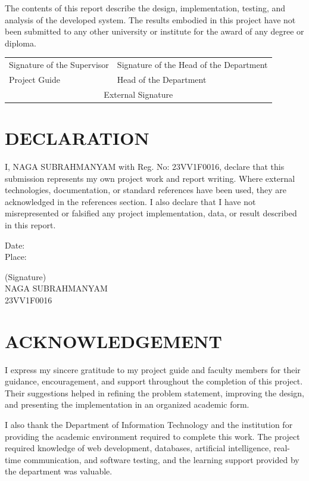 \documentclass[12pt,a4paper]{report}
\begin{document}
The contents of this report describe the design, implementation, testing, and analysis of the developed system. The results embodied in this project have not been submitted to any other university or institute for the award of any degree or diploma.

\vspace{1.8cm}
\noindent\begin{tabular}{p{}p{}}
Signature of the Supervisor & Signature of the Head of the Department\\[1.6cm]
Project Guide & Head of the Department\\[1.4cm]
\multicolumn{2}{c}{External Signature}
\end{tabular}

\clearpage
\chapter*{DECLARATION}
\justifying
I, NAGA SUBRAHMANYAM with Reg. No: 23VV1F0016, declare that this submission represents my own project work and report writing. Where external technologies, documentation, or standard references have been used, they are acknowledged in the references section. I also declare that I have not misrepresented or falsified any project implementation, data, or result described in this report.

\vspace{1.5cm}
\noindent Date:\\
Place:

\vspace{1.5cm}
\begin{flushright}
(Signature)\\
NAGA SUBRAHMANYAM\\
23VV1F0016
\end{flushright}

\clearpage
\chapter*{ACKNOWLEDGEMENT}
\justifying
I express my sincere gratitude to my project guide and faculty members for their guidance, encouragement, and support throughout the completion of this project. Their suggestions helped in refining the problem statement, improving the design, and presenting the implementation in an organized academic form.

I also thank the Department of Information Technology and the institution for providing the academic environment required to complete this work. The project required knowledge of web development, databases, artificial intelligence, real-time communication, and software testing, and the learning support provided by the department was valuable.
\end{document}
